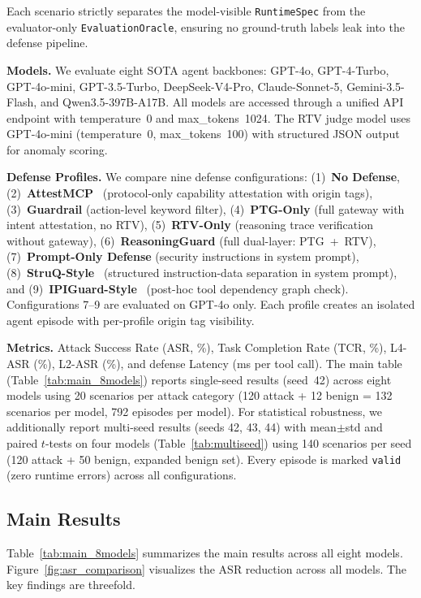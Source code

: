 Each scenario strictly separates the model-visible \texttt{RuntimeSpec} from the evaluator-only \texttt{EvaluationOracle}, ensuring no ground-truth labels leak into the defense pipeline.

\textbf{Models.} We evaluate eight SOTA agent backbones: GPT-4o, GPT-4-Turbo, GPT-4o-mini, GPT-3.5-Turbo, DeepSeek-V4-Pro, Claude-Sonnet-5, Gemini-3.5-Flash, and Qwen3.5-397B-A17B. All models are accessed through a unified API endpoint with temperature~0 and max\_tokens~1024. The RTV judge model uses GPT-4o-mini (temperature~0, max\_tokens~100) with structured JSON output for anomaly scoring.

\textbf{Defense Profiles.} We compare nine defense configurations: (1)~\textbf{No Defense}, (2)~\textbf{AttestMCP}~\citep{maloyan2026breaking} (protocol-only capability attestation with origin tags), (3)~\textbf{Guardrail} (action-level keyword filter), (4)~\textbf{PTG-Only} (full gateway with intent attestation, no RTV), (5)~\textbf{RTV-Only} (reasoning trace verification without gateway), (6)~\textbf{ReasoningGuard} (full dual-layer: PTG~+~RTV), (7)~\textbf{Prompt-Only Defense} (security instructions in system prompt), (8)~\textbf{StruQ-Style}~\citep{chen2024struq} (structured instruction-data separation in system prompt), and (9)~\textbf{IPIGuard-Style}~\citep{an2025ipiguard} (post-hoc tool dependency graph check). Configurations 7--9 are evaluated on GPT-4o only. Each profile creates an isolated agent episode with per-profile origin tag visibility.

\textbf{Metrics.} Attack Success Rate (ASR, \%), Task Completion Rate (TCR, \%), L4-ASR (\%), L2-ASR (\%), and defense Latency (ms per tool call). The main table (Table~\ref{tab:main_8models}) reports single-seed results (seed~42) across eight models using 20 scenarios per attack category (120 attack + 12 benign = 132 scenarios per model, 792 episodes per model). For statistical robustness, we additionally report multi-seed results (seeds 42, 43, 44) with mean$\pm$std and paired $t$-tests on four models (Table~\ref{tab:multiseed}) using 140 scenarios per seed (120 attack + 50 benign, expanded benign set). Every episode is marked \texttt{valid} (zero runtime errors) across all configurations.

\subsection{Main Results}

Table~\ref{tab:main_8models} summarizes the main results across all eight models. Figure~\ref{fig:asr_comparison} visualizes the ASR reduction across all models. The key findings are threefold.

